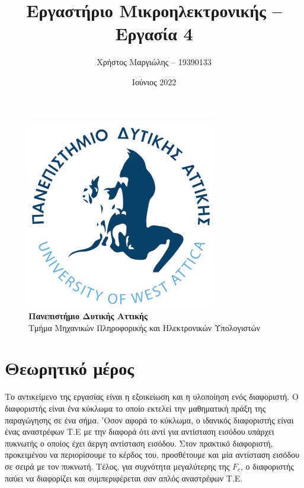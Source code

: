 \documentclass[12pt]{article}
\title{Εργαστήριο Μικροηλεκτρονικής -- Εργασία 4}
\author{Χρήστος Μαργιώλης -- 19390133}
\date{Ιούνιος 2022}
\begin{document}
\begin{titlepage}
        \maketitle
        \begin{figure}[t!]
        \begin{center}
        \includegraphics[scale=0.3]{./res/uniwalogo.png} \\
        \Large
        \textbf{Πανεπιστήμιο Δυτικής Αττικής} \\
        \large
        Τμήμα Μηχανικών Πληροφορικής και Ηλεκτρονικών Υπολογιστών
        \end{center}
        \end{figure}
\end{titlepage}

\renewcommand{\contentsname}{Περιεχόμενα}
\tableofcontents
\pagebreak

\section{Θεωρητικό μέρος}

Το αντικείμενο της εργασίας είναι η εξοικείωση και η υλοποίηση ενός διαφοριστή.
Ο διαφοριστής είναι ένα κύκλωμα το οποίο εκτελεί την μαθηματική πράξη της
παραγώγησης σε ένα σήμα. 'Οσον αφορά το κύκλωμα, ο ιδανικός διαφοριστής είναι
ένας αναστρέφων Τ.Ε με την διαφορά ότι αντί για αντίσταση εισόδου υπάρχει
πυκνωτής ο οποίος έχει άεργη αντίσταση εισόδου. Στον πρακτικό διαφοριστή,
προκειμένου να περιορίσουμε το κέρδος του, προσθέτουμε και μία αντίσταση
εισόδου σε σειρά με τον πυκνωτή. Τέλος, για συχνότητα μεγαλύτερης της $F_c$, ο
διαφοριστής παύει να διαφορίζει και συμπεριφέρεται σαν απλός αναστρέφων Τ.Ε.
\end{document}
